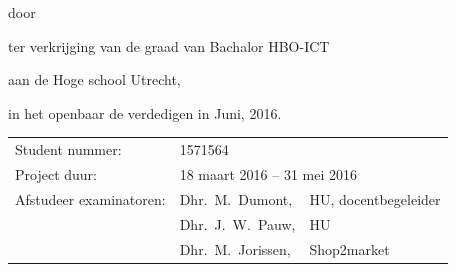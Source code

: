 \begin{titlepage}


\begin{center}


{\makeatletter
\largetitlestyle\fontsize{64}{94}\selectfont\@title
\makeatother}

{\makeatletter
\ifx\@subtitle\undefined\else
    \bigskip
   {\tudsffamily\fontsize{22}{32}\selectfont\@subtitle}    
\fi
\makeatother}

\bigskip
\bigskip

door

\bigskip
\bigskip

{\makeatletter
\largetitlestyle\fontsize{26}{26}\selectfont\@author
\makeatother}

\bigskip
\bigskip

ter verkrijging van de graad van Bachalor HBO-ICT

aan de Hoge school Utrecht,

in het openbaar de verdedigen in Juni, 2016.

\vfill

\begin{tabular}{lll}
    Student nummer: & 1571564 \\
    Project duur: & \multicolumn{2}{l}{18 maart 2016 -- 31 mei 2016} \\
    Afstudeer examinatoren:
        & Dhr.\ M.\ Dumont, & HU, docentbegeleider \\
        & Dhr.\ J.\ W.\ Pauw, & HU \\
        & Dhr.\ M.\ Jorissen, & Shop2market
\end{tabular}




\end{center}


\end{titlepage}

